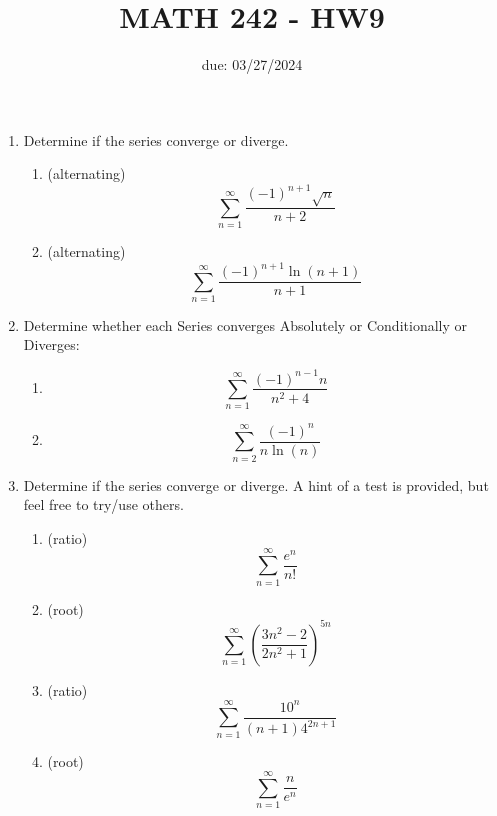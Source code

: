 \documentclass[12pt]{article}
\title{MATH 242 - HW9}
\date{due: 03/27/2024}
\begin{document}
\maketitle

\begin{enumerate}
\item Determine if the series converge or diverge.
\begin{enumerate}
    \item (alternating) $$\sum_{n=1}^{\infty}\frac{(-1)^{n+1}\sqrt{n}}{n+2}$$
    \newpage
    \item (alternating)
    $$\sum_{n=1}^{\infty}\frac{(-1)^{n+1}\ln(n+1)}{n+1}$$
    \vfill
\end{enumerate}

\item Determine whether each Series converges Absolutely or Conditionally or Diverges:
\begin{enumerate}
    \item $$\sum_{n=1}^{\infty}\frac{(-1)^{n-1}n}{n^2+4}$$
    \vfill
    \newpage
    \item $$\sum_{n=2}^{\infty}\frac{(-1)^{n}}{n\ln(n)}$$
    \vfill
\end{enumerate}

\item Determine if the series converge or diverge. A hint of a test is provided, but feel free to try/use others.
\begin{enumerate}
    \item (ratio) $$\sum_{n=1}^{\infty}\frac{e^n}{n!}$$
    \vfill
    \newpage
    \item (root) $$\sum_{n=1}^{\infty}\left(\frac{3n^2-2}{2n^2+1}\right)^{5n}$$
    \vfill
    \item (ratio) $$\sum_{n=1}^{\infty}\frac{10^n}{(n+1)4^{2n+1}}$$
    \vfill
    \newpage
    \item (root)
    $$\sum_{n=1}^{\infty}\frac{n}{e^n}$$
    \vfill
\end{enumerate}


\end{enumerate}
\end{document}
